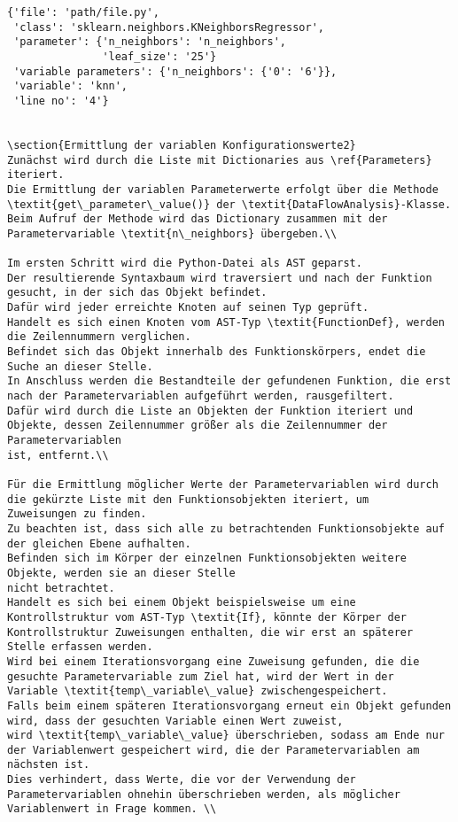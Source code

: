 \documentclass[german,bachelor]{swsLeipzig}
\begin{document}
\begin{lstlisting}[frame=single, basicstyle=\small]
{'file': 'path/file.py',
 'class': 'sklearn.neighbors.KNeighborsRegressor',
 'parameter': {'n_neighbors': 'n_neighbors',
               'leaf_size': '25'}
 'variable parameters': {'n_neighbors': {'0': '6'}},
 'variable': 'knn',
 'line no': '4'}


\section{Ermittlung der variablen Konfigurationswerte2}
Zunächst wird durch die Liste mit Dictionaries aus \ref{Parameters} iteriert.
Die Ermittlung der variablen Parameterwerte erfolgt über die Methode \textit{get\_parameter\_value()} der \textit{DataFlowAnalysis}-Klasse.
Beim Aufruf der Methode wird das Dictionary zusammen mit der Parametervariable \textit{n\_neighbors} übergeben.\\

Im ersten Schritt wird die Python-Datei als AST geparst.
Der resultierende Syntaxbaum wird traversiert und nach der Funktion gesucht, in der sich das Objekt befindet.
Dafür wird jeder erreichte Knoten auf seinen Typ geprüft.
Handelt es sich einen Knoten vom AST-Typ \textit{FunctionDef}, werden die Zeilennummern verglichen.
Befindet sich das Objekt innerhalb des Funktionskörpers, endet die Suche an dieser Stelle.
In Anschluss werden die Bestandteile der gefundenen Funktion, die erst nach der Parametervariablen aufgeführt werden, rausgefiltert.
Dafür wird durch die Liste an Objekten der Funktion iteriert und Objekte, dessen Zeilennummer größer als die Zeilennummer der Parametervariablen
ist, entfernt.\\

Für die Ermittlung möglicher Werte der Parametervariablen wird durch die gekürzte Liste mit den Funktionsobjekten iteriert, um
Zuweisungen zu finden.
Zu beachten ist, dass sich alle zu betrachtenden Funktionsobjekte auf der gleichen Ebene aufhalten.
Befinden sich im Körper der einzelnen Funktionsobjekten weitere Objekte, werden sie an dieser Stelle
nicht betrachtet.
Handelt es sich bei einem Objekt beispielsweise um eine Kontrollstruktur vom AST-Typ \textit{If}, könnte der Körper der
Kontrollstruktur Zuweisungen enthalten, die wir erst an späterer Stelle erfassen werden.
Wird bei einem Iterationsvorgang eine Zuweisung gefunden, die die gesuchte Parametervariable zum Ziel hat, wird der Wert in der
Variable \textit{temp\_variable\_value} zwischengespeichert.
Falls beim einem späteren Iterationsvorgang erneut ein Objekt gefunden wird, dass der gesuchten Variable einen Wert zuweist,
wird \textit{temp\_variable\_value} überschrieben, sodass am Ende nur der Variablenwert gespeichert wird, die der Parametervariablen am
nächsten ist.
Dies verhindert, dass Werte, die vor der Verwendung der Parametervariablen ohnehin überschrieben werden, als möglicher
Variablenwert in Frage kommen. \\


\end{lstlisting}
\end{document}
